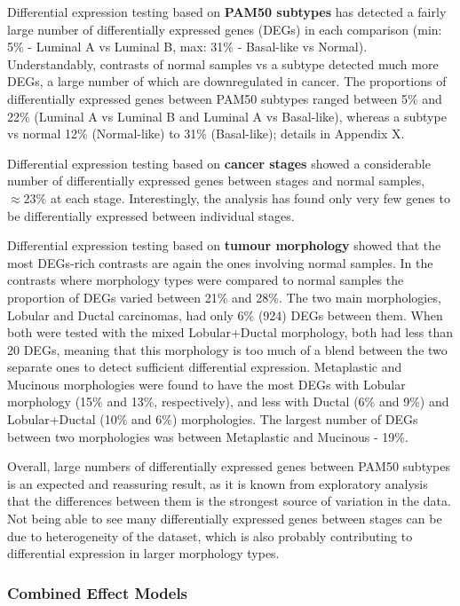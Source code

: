         Differential expression testing based on \textbf{PAM50 subtypes} has detected a fairly large number of differentially expressed genes (DEGs) in each comparison (min: 5\% - Luminal A vs Luminal B, max: 31\% - Basal-like vs Normal). Understandably, contrasts of normal samples vs a subtype detected much more DEGs, a large number of which are downregulated in cancer. The proportions of differentially expressed genes between PAM50 subtypes ranged between 5\% and 22\% (Luminal A vs Luminal B and Luminal A vs Basal-like), whereas a subtype vs normal 12\% (Normal-like) to 31\% (Basal-like); details in Appendix X. 
        
        Differential expression testing based on \textbf{cancer stages} showed a considerable number of differentially expressed genes between stages and normal samples, $\approx 23\%$ at each stage. Interestingly, the analysis has found only very few genes to be differentially expressed between individual stages.
        
        Differential expression testing based on \textbf{tumour morphology }showed that the most DEGs-rich contrasts are again the ones involving normal samples. In the contrasts where morphology types were compared to normal samples the proportion of DEGs varied between 21\% and 28\%. The two main morphologies, Lobular and Ductal carcinomas,  had only 6\% (924) DEGs between them. When both were tested with the mixed Lobular+Ductal morphology, both had less than 20 DEGs, meaning that this morphology is too much of a blend between the two separate ones to detect sufficient differential expression. Metaplastic and Mucinous morphologies were found to have the most DEGs with Lobular morphology (15\% and 13\%, respectively), and less with Ductal (6\% and 9\%) and Lobular+Ductal (10\% and 6\%) morphologies. The largest number of DEGs between two morphologies was between Metaplastic and Mucinous - 19\%. 
        
        Overall, large numbers of differentially expressed genes between PAM50 subtypes is an expected and reassuring result, as it is known from exploratory analysis that the differences between them is the strongest source of variation in the data. Not being able to see many differentially expressed genes between stages can be due to heterogeneity of the dataset, which is also probably contributing to differential expression in larger morphology types. 
        
        
        \subsubsection{Combined Effect Models}
        
